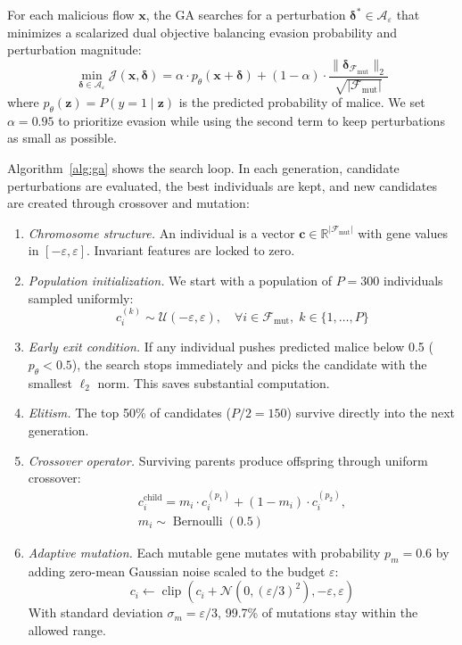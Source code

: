 \documentclass[iicol,pdflatex,sn-mathphys-num]{sn-jnl}
\begin{document}
For each malicious flow $\mathbf{x}$, the GA searches for a perturbation $\boldsymbol{\delta}^* \in \mathcal{A}_\varepsilon$ that minimizes a scalarized dual objective balancing evasion probability and perturbation magnitude:
\begin{equation}
    \min_{\boldsymbol{\delta} \in \mathcal{A}_\varepsilon} \mathcal{J}(\mathbf{x}, \boldsymbol{\delta}) = \alpha \cdot p_\theta(\mathbf{x} + \boldsymbol{\delta}) + (1 - \alpha) \cdot \frac{\|\boldsymbol{\delta}_{\mathcal{F}_{\text{mut}}}\|_2}{\sqrt{|\mathcal{F}_{\text{mut}}|}}
    \label{eq:ga_objective}
\end{equation}
where $p_\theta(\mathbf{z}) = P(y=1 \mid \mathbf{z})$ is the predicted probability of malice. We set $\alpha = 0.95$ to prioritize evasion while using the second term to keep perturbations as small as possible.

Algorithm~\ref{alg:ga} shows the search loop. In each generation, candidate perturbations are evaluated, the best individuals are kept, and new candidates are created through crossover and mutation:
\begin{enumerate}
    \item \textit{Chromosome structure.} An individual is a vector $\mathbf{c} \in \mathbb{R}^{|\mathcal{F}_{\text{mut}}|}$ with gene values in $[-\varepsilon, \varepsilon]$. Invariant features are locked to zero.
    \item \textit{Population initialization.} We start with a population of $P=300$ individuals sampled uniformly:
    \begin{equation}
        c^{(k)}_i \sim \mathcal{U}(-\varepsilon, \varepsilon), \quad \forall i \in \mathcal{F}_{\text{mut}}, \; k \in \{1, \dots, P\}
    \end{equation}
    \item \textit{Early exit condition.} If any individual pushes predicted malice below 0.5 ($p_\theta < 0.5$), the search stops immediately and picks the candidate with the smallest $\ell_2$ norm. This saves substantial computation.
    \item \textit{Elitism.} The top 50\% of candidates ($P/2 = 150$) survive directly into the next generation.
    \item \textit{Crossover operator.} Surviving parents produce offspring through uniform crossover:
    \begin{multline}
        c^{\text{child}}_i = m_i \cdot c^{(p_1)}_i + (1 - m_i) \cdot c^{(p_2)}_i,\\
        m_i \sim \operatorname{Bernoulli}(0.5)
    \end{multline}
    \item \textit{Adaptive mutation.} Each mutable gene mutates with probability $p_m = 0.6$ by adding zero-mean Gaussian noise scaled to the budget $\varepsilon$:
    \begin{equation}
        c_i \leftarrow \operatorname{clip}\left(c_i + \mathcal{N}\left(0, (\varepsilon/3)^2\right), -\varepsilon, \varepsilon\right)
    \end{equation}
    With standard deviation $\sigma_m = \varepsilon/3$, 99.7\% of mutations stay within the allowed range.
\end{enumerate}
\end{document}
